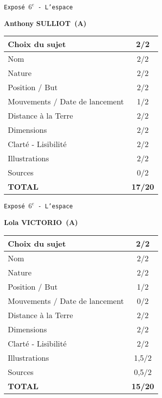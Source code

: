 	\vspace*{1cm}
	
	\newpage
	\LARGE{\texttt{Expos\'e $6^e$ - L'espace}}
	\vspace*{1cm}

	\textbf{Anthony SULLIOT\ (A)}

	\vspace*{1.5cm}
	\begin{tabular}{|l|c|}
		\hline
		Choix du sujet & 2/2 \\
		\hline
		Nom & 2/2 \\
		\hline
		Nature & 2/2 \\
		\hline
		Position / But & 2/2 \\
		\hline
		Mouvements / Date de lancement & 1/2 \\
		\hline
		Distance \`a la Terre & 2/2 \\
		\hline
		Dimensions & 2/2 \\
		\hline
		Clart\'e - Lisibilit\'e & 2/2 \\
		\hline
		Illustrations & 2/2 \\
		\hline
		Sources & 0/2 \\
		\hline
		\textbf{TOTAL}  & \textbf{17/20} \\
		\hline
	\end{tabular}

	\vspace*{1cm}
	
	\newpage
	\LARGE{\texttt{Expos\'e $6^e$ - L'espace}}
	\vspace*{1cm}

	\textbf{Lola VICTORIO\ (A)}

	\vspace*{1.5cm}
	\begin{tabular}{|l|c|}
		\hline
		Choix du sujet & 2/2 \\
		\hline
		Nom & 2/2 \\
		\hline
		Nature & 2/2 \\
		\hline
		Position / But & 1/2 \\
		\hline
		Mouvements / Date de lancement & 0/2 \\
		\hline
		Distance \`a la Terre & 2/2 \\
		\hline
		Dimensions & 2/2 \\
		\hline
		Clart\'e - Lisibilit\'e & 2/2 \\
		\hline
		Illustrations & 1,5/2 \\
		\hline
		Sources & 0,5/2 \\
		\hline
		\textbf{TOTAL}  & \textbf{15/20} \\
		\hline
	\end{tabular}

	\vspace*{1cm}
	
	\newpage
